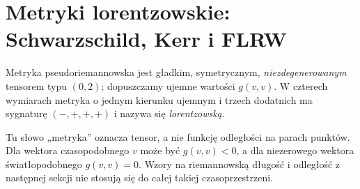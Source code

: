\section{Metryki lorentzowskie: Schwarzschild, Kerr i FLRW}
\label{sec:metryki-lorentzowskie}

\begin{definicja}
\label{def:metryka-lorentzowska}
Metryka pseudoriemannowska jest gładkim,
symetrycznym, \emph{niezdegenerowanym} tensorem
typu $(0,2)$; dopuszczamy ujemne wartości $g(v,v)$.
W czterech wymiarach metryka o jednym kierunku
ujemnym i trzech dodatnich ma sygnaturę $(-,+,+,+)$
i nazywa się \emph{lorentzowską}.
\end{definicja}

Tu słowo „metryka” oznacza tensor, a nie funkcję
odległości na parach punktów. Dla wektora
czasopodobnego $v$ może być $g(v,v)<0$, a dla
niezerowego wektora światłopodobnego $g(v,v)=0$.
Wzory na riemannowską długość i odległość
z następnej sekcji nie stosują się do całej
takiej czasoprzestrzeni.

